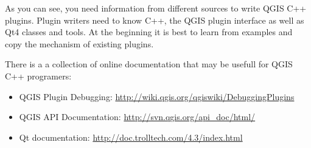As you can see, you need information from different sources to write QGIS C++
plugins. Plugin writers need to know C++, the QGIS plugin interface as
well as Qt4 classes and tools. At the beginning it is best to learn from
examples and copy the mechanism of existing plugins. 

There is a a collection of online documentation that may be usefull for
QGIS C++ programers:

\begin{itemize}
\item QGIS Plugin Debugging: \url{http://wiki.qgis.org/qgiswiki/DebuggingPlugins}
\item QGIS API Documentation: \url{http://svn.qgis.org/api_doc/html/}
\item Qt documentation: \url{http://doc.trolltech.com/4.3/index.html}
\end{itemize}

